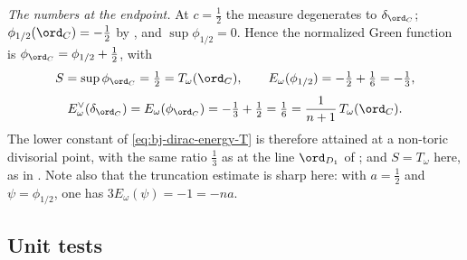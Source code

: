 \begin{example}
\emph{The numbers at the endpoint.}  At $c=\tfrac12$ the measure
degenerates to $\delta_{\ord_C}$; $\phi_{1/2}(\ord_C)=-\tfrac12$ by
, and $\sup\phi_{1/2}=0$.  Hence the
normalized Green function is $\phi_{\ord_C}=\phi_{1/2}+\tfrac12$, with
\[
 S=\sup\phi_{\ord_C}=\tfrac12=T_\omega(\ord_C),
 \qquad
 E_\omega(\phi_{1/2})=-\tfrac12+\tfrac16=-\tfrac13,
\]
\[
 E^\vee_\omega(\delta_{\ord_C})
 =E_\omega(\phi_{\ord_C})=-\tfrac13+\tfrac12=\tfrac16
 =\frac{1}{n+1}\,T_\omega(\ord_C).
\]
The lower constant of \eqref{eq:bj-dirac-energy-T} is therefore attained at
a non-toric divisorial point, with the same ratio $\tfrac13$ as at the
line $\ord_{D_1}$ of ; and
$S=T_\omega$ here, as in .  Note also that the
truncation estimate  is sharp here: with
$a=\tfrac12$ and $\psi=\phi_{1/2}$, one has
$3E_\omega(\psi)=-1=-na$.
\end{example}

\subsection{Unit tests}
\label{sec:ch49-unit-tests}

